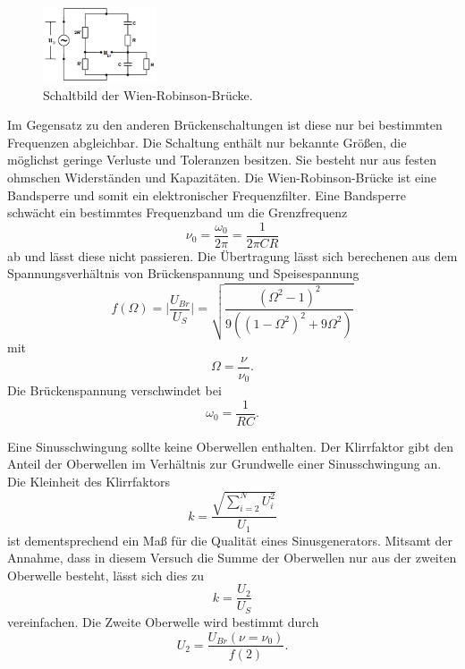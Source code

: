 \begin{figure}[H]
    \centering
    \includegraphics[width=0.3\textwidth]{build/wien-robinson.PNG}
    \caption{Schaltbild der Wien-Robinson-Brücke.\cite[222]{V302}}
    \label{fig:wien-robinson}
\end{figure}
Im Gegensatz zu den anderen Brückenschaltungen ist diese nur bei bestimmten Frequenzen abgleichbar.
Die Schaltung enthält nur bekannte Größen, die möglichst geringe Verluste und Toleranzen besitzen.
Sie besteht nur aus festen ohmschen Widerständen und Kapazitäten.
Die Wien-Robinson-Brücke ist eine Bandsperre und somit ein elektronischer Frequenzfilter.
Eine Bandsperre schwächt ein bestimmtes Frequenzband um die Grenzfrequenz
\begin{equation}
    \nu_0 = \frac{\omega_0}{2\pi} = \frac{1}{2\pi CR}
    \label{eqn:grenzfrequenz}
\end{equation}
ab und lässt diese nicht passieren.
Die Übertragung lässt sich berechenen aus dem Spannungsverhältnis von Brückenspannung und Speisespannung
\begin{equation}
    f(\Omega) = \Biggl \lvert \frac{U_{Br}}{U_S} \Biggr \rvert = \sqrt{\frac{(\Omega^2 -1)^2}{9((1-\Omega^2)^2+9\Omega^2)}}
    \label{eqn:f(omega)}
\end{equation}
mit 
\begin{equation}
    \Omega = \frac{\nu}{\nu_0}.
\end{equation}
Die Brückenspannung verschwindet bei 
\begin{equation}
    \omega_0 = \frac{1}{RC}.
\end{equation}

\noindent Eine Sinusschwingung sollte keine Oberwellen enthalten. 
Der Klirrfaktor gibt den Anteil der Oberwellen im Verhältnis zur Grundwelle einer Sinusschwingung an.
Die Kleinheit des Klirrfaktors
\begin{equation}
    k =  \frac{\sqrt{\sum_{i=2}^N U_i^2}}{U_1}
\end{equation}
ist dementsprechend ein Maß für die Qualität eines Sinusgenerators.
Mitsamt der Annahme, dass in diesem Versuch die Summe der Oberwellen nur aus der zweiten Oberwelle besteht, lässt sich dies zu 
\begin{equation}
    k = \frac{U_2}{U_S}
    \label{eqn:k_einf}
\end{equation}
vereinfachen.
Die Zweite Oberwelle wird bestimmt durch
\begin{equation}
    U_2 = \frac{U_{Br}(\nu = \nu_0)}{f(2)}.
\end{equation}
